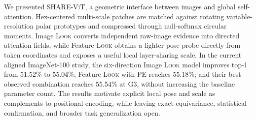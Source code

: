 \documentclass[10pt]{article}
\newcommand{\method}{SHARE-ViT}
\newcommand{\look}{\textsc{Look}}
\begin{document}
We presented \method{}, a geometric interface between images and global
self-attention. Hex-centered multi-scale patches are matched against rotating
variable-resolution polar prototypes and compressed through null-softmax
circular moments. Image \look{} converts independent raw-image evidence into
directed attention fields, while Feature \look{} obtains a lighter pose probe
directly from token coordinates and exposes a useful local layer-sharing
scale. In the current aligned ImageNet-100 study, the six-direction Image
\look{} model improves top-1 from 51.52\% to 55.04\%; Feature \look{} with PE
reaches 55.18\%; and their best observed combination reaches 55.54\% at G3,
without increasing the baseline parameter count. The results motivate explicit
local pose and scale as complements to positional encoding, while leaving exact
equivariance, statistical confirmation, and broader task generalization open.

\raggedbottom
\footnotesize


\end{document}
